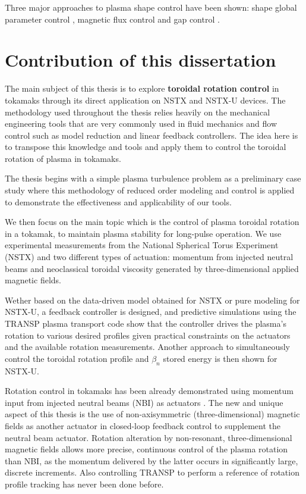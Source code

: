\documentclass[12pt,lot, lof]{puthesis}
\begin{document}
Three major approaches to plasma shape control have been shown: shape global parameter control \cite{Kessel90} , magnetic flux control \cite{Hofmann90, Jhang01} and gap control \cite{Villone97, Albanese03}. 



\section{Contribution of this dissertation}
The main subject of this thesis is to explore {\bf{toroidal rotation control}}  in tokamaks through its direct application on NSTX and NSTX-U devices. 
The methodology used throughout the thesis relies heavily on the mechanical engineering tools that are very commonly used in fluid mechanics and flow control such as model reduction and linear feedback controllers. The idea here is to transpose this knowledge and tools and apply them to control the toroidal rotation of plasma in tokamaks. 

The thesis begins with a simple plasma turbulence problem as a preliminary case study where this methodology of reduced order modeling and control is applied to demonstrate the effectiveness and applicability of our tools. 

We then focus on the main topic which is the control of plasma toroidal rotation in a tokamak, to maintain plasma stability for long-pulse operation. We use experimental measurements from the National Spherical Torus Experiment (NSTX) and two different types of actuation: momentum from injected neutral beams and neoclassical toroidal viscosity generated by three-dimensional applied magnetic fields. 

Wether based on the data-driven model obtained for NSTX or pure modeling for NSTX-U, a feedback controller is designed, and predictive simulations using the TRANSP plasma transport code show that the controller drives the plasma's rotation to various desired profiles given practical constraints on the actuators and the available rotation measurements. Another approach to simultaneously control the toroidal rotation profile and $\beta_n$ stored energy is then shown for NSTX-U. 

Rotation control in tokamaks has been already demonstrated using momentum input from injected neutral beams (NBI) as actuators \cite{Scoville07, Yoshida09}.  The new and unique aspect of this thesis is the use of non-axisymmetric (three-dimensional) magnetic fields as another actuator in closed-loop feedback control to supplement the neutral beam actuator. Rotation alteration by non-resonant, three-dimensional magnetic fields allows more precise, continuous control of the plasma rotation than NBI, as the momentum delivered by the latter occurs in significantly large, discrete increments.
Also controlling TRANSP to perform a  reference of rotation profile tracking has never been done before.
\end{document}
